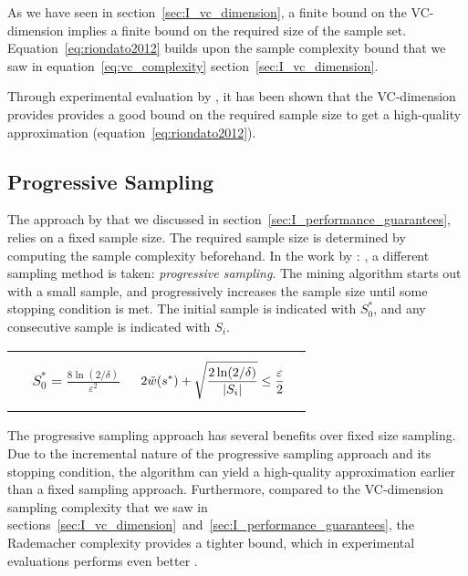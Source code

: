 \documentclass[../main.tex]{subfiles}
\begin{document}
As we have seen in section~\ref{sec:I_vc_dimension}, a finite bound on the VC-dimension implies a finite bound on
the required size of the sample set.
Equation~\ref{eq:riondato2012} builds upon the sample complexity bound that we saw in equation~\ref{eq:vc_complexity} section~\ref{sec:I_vc_dimension}.


Through experimental evaluation by \citeauthor{Riondato2012} \cite{Riondato2012},
it has been shown that the VC-dimension provides provides a good bound on the required sample size to get a high-quality approximation (equation~\ref{eq:riondato2012}).


\subsection{Progressive Sampling}
\label{sec:I_progressive_sampling}

The approach by \citeauthor{Riondato2012} \cite{Riondato2012} that we discussed in section~\ref{sec:I_performance_guarantees},
relies on a fixed sample size.
The required sample size is determined by computing the sample complexity beforehand.
In the work by \citeauthor{Riondato2015} \cite{Riondato2015}: ,
a different sampling method is taken: \emph{progressive sampling}.
The mining algorithm starts out with a small sample, and progressively increases the sample size until some stopping condition is met.
The initial sample is indicated with $S_{0}^{*}$, and any consecutive sample is indicated with $S_{i}$.


\begin{tabularx}{\textwidth}{X X}
    {\begin{align} \label{eq:rademacher_start}
        & S_{0}^{*} = \frac{8 \ln(2 / \delta)}{\varepsilon^{2}}
    \end{align}}
     & 
    {\begin{align} \label{eq:rademacher_stop}
        & 2\tilde{w}(s^{*}) + \sqrt{\frac{2 \ln(2 / \delta)}{\lvert S_{i}\rvert}} \le \frac{\varepsilon}{2}
    \end{align}}
\end{tabularx}

The progressive sampling approach has several benefits over fixed size sampling.
Due to the incremental nature of the progressive sampling approach and its stopping condition,
the algorithm can yield a high-quality approximation earlier than a fixed sampling approach.
Furthermore, compared to the VC-dimension sampling complexity that we saw in sections~\ref{sec:I_vc_dimension}~and~\ref{sec:I_performance_guarantees},
the Rademacher complexity provides a tighter bound, which in experimental evaluations performs even better \cite{Riondato2015}.
\end{document}
